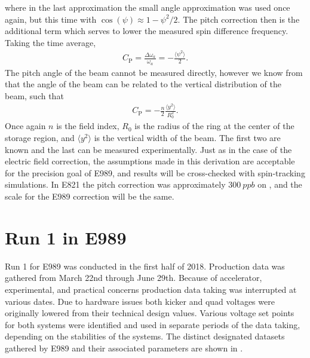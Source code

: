 where in the last approximation the small angle approximation was used once again, but this time with $\cos(\psi) \approx 1 - \psi^{2}/2$. The pitch correction then is the additional term which serves to lower the measured spin difference frequency. Taking the time average,
        \begin{align}
            C_{\text{P}} = \frac{\Delta\omega_{a}}{\omega_{a}} = - \frac{\langle \psi^{2} \rangle}{2}.
        \end{align}
The pitch angle of the beam cannot be measured directly, however we know from  that the angle of the beam can be related to the vertical distribution of the beam, such that 
        \begin{align}
            C_{\text{P}} = - \frac{n}{2} \frac{\langle y^{2} \rangle}{R_{0}^{2}}.
        \end{align}
Once again $n$ is the field index, $R_{0}$ is the radius of the ring at the center of the storage region, and $\langle y^{2} \rangle$ is the vertical width of the beam. The first two are known and the last can be measured experimentally. Just as in the case of the electric field correction, the assumptions made in this derivation are acceptable for the precision goal of E989, and results will be cross-checked with spin-tracking simulations. In E821 the pitch correction was approximately $\SI{300}{ppb}$ on \wa \cite{E821FinalReport}, and the scale for the E989 correction will be the same.




\section{Run 1 in E989}
\label{sec:Run1}


Run 1 for E989 was conducted in the first half of 2018. Production data was gathered from March 22nd through June 29th. Because of accelerator, experimental, and practical concerns production data taking was interrupted at various dates. Due to hardware issues both kicker and quad voltages were originally lowered from their technical design values. Various voltage set points for both systems were identified and used in separate periods of the data taking, depending on the stabilities of the systems. The distinct designated datasets gathered by E989 and their associated parameters are shown in . 


